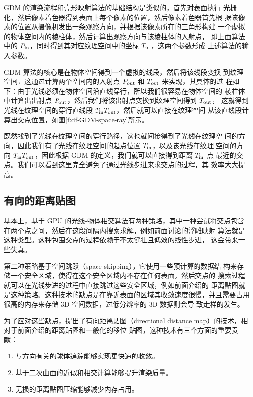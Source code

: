 GDM 的渲染流程和壳形映射算法的基础结构是类似的，首先对表面执行 光栅化，然后像素着色器得到表面上每个像素的位置，然后像素着色器首先根 据该像素的位置从摄像机发出一条观察方向，并根据该像素所在的三角形构建 一个虚拟的物体空间内的棱柱体，然后计算出观察方向与该棱柱体的入射点， 即上面算法中的 $P_{\rm in}$，同时得到其对应纹理空间中的坐标 $T_{\rm in}$，这两个参数形成 上述算法的输入参数。

GDM 算法的核心是在物体空间得到一个虚拟的线段，然后将该线段变换 到纹理空间，这通过计算两个空间内的入射点 $P_{\rm out}$ 和 $T_{\rm out}$ 来实现，其具体的过 程如下：由于光线必须在物体空间沿直线穿行，所以我们很容易在物体空间的 棱柱体中计算出出射点 $P_{\rm out}$，然后我们将该出射点变换到纹理空间得到 $T_{\rm out}$， 这就得到光线在纹理空间的穿行直线段 $T_{\rm in}T_{\rm out}$，然后就可以直接在纹理空间 从该直线段计算出交点位置，如图\ref{f:df-GDM-space-ray}所示。

既然找到了光线在纹理空间的穿行路径，这也就间接得到了光线在纹理空 间的方向，因此我们有了光线在纹理空间的起点位置 $T_{\rm in}$，以及该光线在纹理 空间的方向 $T_{\rm in}T_{\rm out}$，因此根据 GDM 的定义，我们就可以直接得到距离 $T_{\rm in}$ 点 最近的交点。我们可以看到这里完全避免了通过光线步进来求交点的过程，其 效率大大提高。




\subsection{有向的距离贴图}
基本上，基于 GPU 的光线-物体相交算法有两种策略，其中一种尝试将交点包含在两个点之间，然后在这段间隔内搜索求解，例如前面讨论的浮雕映射 算法就是这种类型。这种包围交点的过程依赖于不太健壮且低效的线性步进， 这会带来一些失真。

第二种策略基于空间跳跃（space skipping），它使用一些预计算的数据结 构来存储一个安全区域，使得在这个安全区域内不存在任何表面。然后交点的 搜索过程就可以在光线步进的过程中直接跳过这些安全区域，例如前面介绍的 距离贴图就是这种策略。这种技术的缺点是在靠近表面的区域其收敛速度很慢，并且需要占用很高的内存来存储 3D 空间数据，过低分辨率的 3D 数据则会导 致走样的发生。

为了应对这些缺点，\cite{a:directional-distance-maps}提出了有向距离贴图（directional distance map）的技术，相对于前面介绍的距离贴图和一般化的移位 贴图，这种技术有三个方面的重要贡献：

\begin{enumerate}
	\item 与方向有关的球体追踪能够实现更快速的收敛。
	\item 基于二次曲面的近似和相交计算能够提升渲染质量。 
	\item 无损的距离贴图压缩能够减少内存占用。
\end{enumerate}

